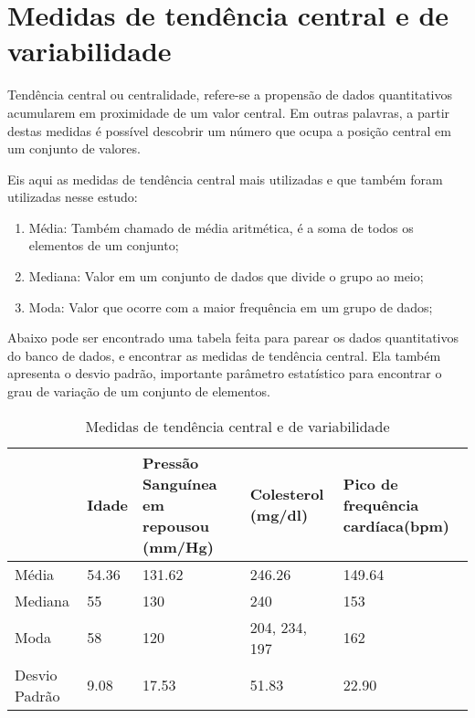 \chapter{Medidas de tendência central e de variabilidade}

    Tendência central ou centralidade, refere-se a propensão de dados quantitativos acumularem
    em proximidade de um valor central. Em outras palavras, a partir destas medidas é possível 
    descobrir um número que ocupa a posição central em um conjunto de valores.

    Eis aqui as medidas de tendência central mais utilizadas e que também foram utilizadas nesse 
    estudo:

    \begin{enumerate}[label={\alph*)}]
      \addtolength{\itemindent}{1.25cm}
      \item Média: Também chamado de média aritmética, é a soma de todos os elementos de um conjunto;
      \item Mediana: Valor em um conjunto de dados que divide o grupo ao meio;
      \item Moda: Valor que ocorre com a maior frequência em um grupo de dados;
    \end{enumerate}

    Abaixo pode ser encontrado uma tabela feita para parear os dados quantitativos do banco de dados, 
    e encontrar as medidas de tendência central. Ela também apresenta o desvio padrão, importante 
    parâmetro estatístico para encontrar o grau de variação de um conjunto de elementos.

    \begin{table}[htb]
      \caption{Medidas de tendência central e de variabilidade}
      \centering
        \begin{tabular}{ |P{2.8cm} |P{2cm}|P{3cm}|P{3cm}|P{3cm}|  }
          \hline
            & Idade & Pressão Sanguínea em repousou     (mm/Hg) & Colesterol  (mg/dl) & Pico de frequência cardíaca(bpm)\\
          \hline
          Média & 54.36 & 131.62 & 246.26 & 149.64 \\
          \hline
          Mediana & 55 & 130 & 240 & 153 \\
          \hline
          Moda & 58 & 120 & 204, 234, 197 & 162 \\
          \hline
          Desvio Padrão & 9.08 & 17.53 & 51.83 & 22.90 \\
          \hline
        \end{tabular}
    \end{table}

